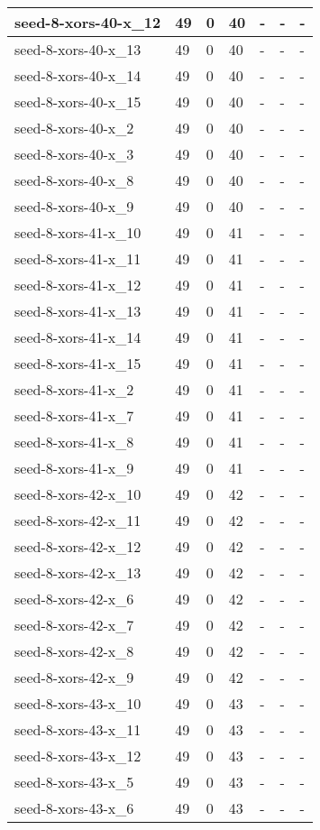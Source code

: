 \begin{scriptsize}
\begin{longtable}{|p{5cm}|l|l|l|l|l|l|}
seed-8-xors-40-x\_12&49&0&40&-&-&- \\ \hline 
seed-8-xors-40-x\_13&49&0&40&-&-&- \\ \hline 
seed-8-xors-40-x\_14&49&0&40&-&-&- \\ \hline 
seed-8-xors-40-x\_15&49&0&40&-&-&- \\ \hline 
seed-8-xors-40-x\_2&49&0&40&-&-&- \\ \hline 
seed-8-xors-40-x\_3&49&0&40&-&-&- \\ \hline 
seed-8-xors-40-x\_8&49&0&40&-&-&- \\ \hline 
seed-8-xors-40-x\_9&49&0&40&-&-&- \\ \hline 
seed-8-xors-41-x\_10&49&0&41&-&-&- \\ \hline 
seed-8-xors-41-x\_11&49&0&41&-&-&- \\ \hline 
seed-8-xors-41-x\_12&49&0&41&-&-&- \\ \hline 
seed-8-xors-41-x\_13&49&0&41&-&-&- \\ \hline 
seed-8-xors-41-x\_14&49&0&41&-&-&- \\ \hline 
seed-8-xors-41-x\_15&49&0&41&-&-&- \\ \hline 
seed-8-xors-41-x\_2&49&0&41&-&-&- \\ \hline 
seed-8-xors-41-x\_7&49&0&41&-&-&- \\ \hline 
seed-8-xors-41-x\_8&49&0&41&-&-&- \\ \hline 
seed-8-xors-41-x\_9&49&0&41&-&-&- \\ \hline 
seed-8-xors-42-x\_10&49&0&42&-&-&- \\ \hline 
seed-8-xors-42-x\_11&49&0&42&-&-&- \\ \hline 
seed-8-xors-42-x\_12&49&0&42&-&-&- \\ \hline 
seed-8-xors-42-x\_13&49&0&42&-&-&- \\ \hline 
seed-8-xors-42-x\_6&49&0&42&-&-&- \\ \hline 
seed-8-xors-42-x\_7&49&0&42&-&-&- \\ \hline 
seed-8-xors-42-x\_8&49&0&42&-&-&- \\ \hline 
seed-8-xors-42-x\_9&49&0&42&-&-&- \\ \hline 
seed-8-xors-43-x\_10&49&0&43&-&-&- \\ \hline 
seed-8-xors-43-x\_11&49&0&43&-&-&- \\ \hline 
seed-8-xors-43-x\_12&49&0&43&-&-&- \\ \hline 
seed-8-xors-43-x\_5&49&0&43&-&-&- \\ \hline 
seed-8-xors-43-x\_6&49&0&43&-&-&- \\ \hline 

\end{longtable}
\end{scriptsize}
